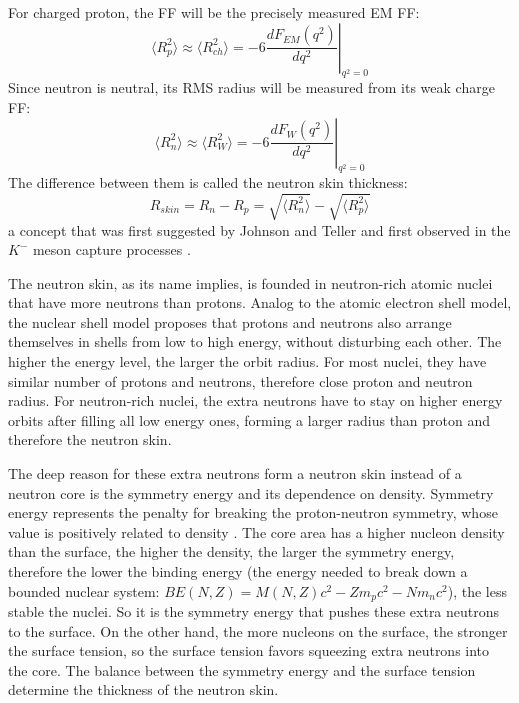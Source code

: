 For charged proton, the FF will be the precisely measured EM FF:
\begin{equation}
    \langle R_p^2 \rangle \approx \langle R_{ch}^2 \rangle= -6 \left. \frac{dF_{EM}(q^2)}{dq^2} \right|_{q^2 = 0}
\end{equation}
Since neutron is neutral, its RMS radius will be measured from its weak charge FF:
\begin{equation}
    \langle R_n^2 \rangle \approx \langle R_W^2 \rangle = -6 \left. \frac{dF_{W}(q^2)}{dq^2} \right|_{q^2 = 0}
\end{equation}
The difference between them is called the neutron skin thickness:
\begin{equation}
    R_{skin} = R_n - R_p = \sqrt{\langle R_n^2 \rangle} - \sqrt{\langle R_p^2 \rangle}
\end{equation}
a concept that was first suggested by Johnson and Teller \cite{PhysRev.93.357}
and first observed in the $K^-$ meson capture processes \cite{BURHOP1969625}.

The neutron skin, as its name implies, is founded in neutron-rich atomic nuclei that
have more neutrons than protons. Analog to the atomic electron shell model, the nuclear
shell model proposes that protons and neutrons also arrange themselves in
shells from low to high energy, without disturbing each other.
The higher the energy level, the larger the orbit radius.
For most nuclei, they have similar number of protons and neutrons, therefore 
close proton and neutron radius. For neutron-rich nuclei, the extra neutrons
have to stay on higher energy orbits after filling all low energy ones, forming
a larger radius than proton and therefore the neutron skin.

The deep reason for these extra neutrons form a neutron skin instead of
a neutron core is the symmetry energy and its dependence on density. 
Symmetry energy represents the penalty for breaking the proton-neutron symmetry,
whose value is positively related to density \cite{10.3389/fphy.2019.00213}.
The core area has a higher nucleon density than the surface, the higher the density, 
the larger the symmetry energy, therefore the lower the binding energy (the energy
needed to break down a bounded nuclear system: $BE(N, Z) = M(N, Z)c^2 - Zm_p c^2 - Nm_n c^2$), 
the less stable the nuclei. So it is the symmetry energy that pushes these extra neutrons to 
the surface. On the other hand, the more nucleons on the surface, the stronger 
the surface tension, so the surface tension favors squeezing extra neutrons %
into the core. The balance between the symmetry energy and 
the surface tension determine the thickness of the neutron skin.

